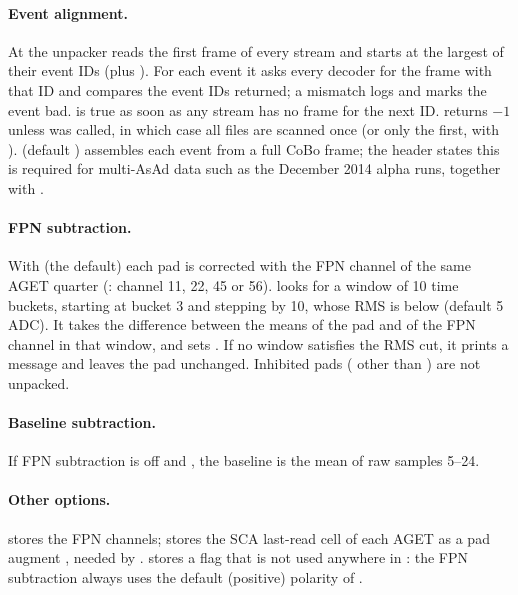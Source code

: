 \paragraph{Event alignment.} At  the unpacker reads the first frame of every stream and
starts at the largest of their event IDs (plus ). For each event it asks
every decoder for the frame with that ID and compares the event IDs returned; a mismatch logs
 and marks the event bad.  is
true as soon as any stream has no frame for the next ID.  returns $-1$ unless
 was called, in which case all files are scanned once (or only the first,
with ).  (default ) assembles
each event from a full CoBo frame; the header states this is required for multi-AsAd data such as
the December 2014 alpha runs, together with .

\paragraph{FPN subtraction.} With  (the default) each pad is corrected
with the FPN channel of the same AGET quarter (: channel 11, 22, 45 or
56).  looks for a window of 10 time buckets, starting at bucket
3 and stepping by 10, whose RMS is below  (default 5 ADC). It takes the
difference between the means of the pad and of the FPN channel in that window, and sets
. If no window satisfies the RMS cut, it prints a message and
leaves the pad unchanged. Inhibited pads ( other than ) are
not unpacked.

\paragraph{Baseline subtraction.} If FPN subtraction is off and
, the baseline is the mean of raw samples 5--24.

\paragraph{Other options.}  stores the FPN channels; 
stores the SCA last-read cell of each AGET as a pad augment , needed by
.  stores a flag that is not used anywhere in
: the FPN subtraction always uses the default (positive) polarity of
.

